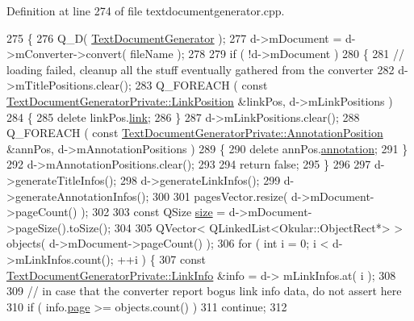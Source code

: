 Definition at line 274 of file textdocumentgenerator.\+cpp.


\begin{DoxyCode}
275 \{
276     Q\_D( \hyperlink{classOkular_1_1TextDocumentGenerator}{TextDocumentGenerator} );
277     d->mDocument = d->mConverter->convert( fileName );
278 
279     \textcolor{keywordflow}{if} ( !d->mDocument )
280     \{
281         \textcolor{comment}{// loading failed, cleanup all the stuff eventually gathered from the converter}
282         d->mTitlePositions.clear();
283         Q\_FOREACH ( \textcolor{keyword}{const} \hyperlink{structOkular_1_1TextDocumentGeneratorPrivate_1_1LinkPosition}{TextDocumentGeneratorPrivate::LinkPosition}
       &linkPos, d->mLinkPositions )
284         \{
285             \textcolor{keyword}{delete} linkPos.\hyperlink{structOkular_1_1TextDocumentGeneratorPrivate_1_1LinkPosition_a28f22efca06cf1df74ae313225771b63}{link};
286         \}
287         d->mLinkPositions.clear();
288         Q\_FOREACH ( \textcolor{keyword}{const} \hyperlink{structOkular_1_1TextDocumentGeneratorPrivate_1_1AnnotationPosition}{TextDocumentGeneratorPrivate::AnnotationPosition}
       &annPos, d->mAnnotationPositions )
289         \{
290             \textcolor{keyword}{delete} annPos.\hyperlink{structOkular_1_1TextDocumentGeneratorPrivate_1_1AnnotationPosition_af557e1e52655a87adfac85e87a112c94}{annotation};
291         \}
292         d->mAnnotationPositions.clear();
293 
294         \textcolor{keywordflow}{return} \textcolor{keyword}{false};
295     \}
296 
297     d->generateTitleInfos();
298     d->generateLinkInfos();
299     d->generateAnnotationInfos();
300 
301     pagesVector.resize( d->mDocument->pageCount() );
302 
303     \textcolor{keyword}{const} QSize \hyperlink{synctex__parser_8c_aa23c661441688350614bd6a350d2b6ff}{size} = d->mDocument->pageSize().toSize();
304 
305     QVector< QLinkedList<Okular::ObjectRect*> > objects( d->mDocument->pageCount() );
306     \textcolor{keywordflow}{for} ( \textcolor{keywordtype}{int} i = 0; i < d->mLinkInfos.count(); ++i ) \{
307         \textcolor{keyword}{const} \hyperlink{structOkular_1_1TextDocumentGeneratorPrivate_1_1LinkInfo}{TextDocumentGeneratorPrivate::LinkInfo} &info = d->
      mLinkInfos.at( i );
308 
309         \textcolor{comment}{// in case that the converter report bogus link info data, do not assert here}
310         \textcolor{keywordflow}{if} ( info.\hyperlink{structOkular_1_1TextDocumentGeneratorPrivate_1_1LinkInfo_aa123a5ca9189d3638522328da29e80b4}{page} >= objects.count() )
311           \textcolor{keywordflow}{continue};
312 

\end{DoxyCode}
